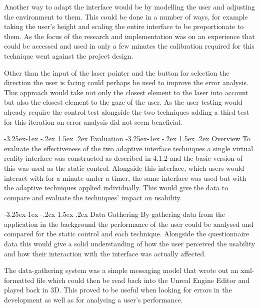 \documentclass[12pt]{article}
\makeatletter
\renewcommand{\subsection}{\@startsection{subsection}{2}{\z@}%
             {-3.25ex\@plus -1ex \@minus -.2ex}%
             {1.5ex \@plus .2ex}%
             {\normalfont\large\scshape\bfseries}}
\renewcommand{\subsubsection}{\@startsection{subsubsection}{2}{\z@}%
             {-3.25ex\@plus -1ex \@minus -.2ex}%
             {1.5ex \@plus .2ex}%
             {\normalfont\normalsize\scshape\bfseries}}
\makeatother
\begin{document}
Another way to adapt the interface would be by modelling the user and adjusting the environment to them. This could be done in a number of ways, for example taking the user's height and scaling the entire interface to be proportionate to them. As the focus of the research and implementation was on an experience that could be accessed and used in only a few minutes the calibration required for this technique went against the project design.

Other than the input of the laser pointer and the button for selection the direction the user is facing could perhaps be used to improve the error analysis. This approach would take not only the closest element to the laser into account but also the closest element to the gaze of the user. As the user testing would already require the control test alongside the two techniques adding a third test for this iteration on error analysis did not seem beneficial.

\subsection{Evaluation}
\subsubsection{Overview}
To evaluate the effectiveness of the two adaptive interface techniques a single virtual reality interface was constructed as described in 4.1.2 and the basic version of this was used as the static control. Alongside this interface, which users would interact with for a minute under a timer, the same interface was used but with the adaptive techniques applied individually. This would give the data to compare and evaluate the techniques' impact on usability.

\subsubsection{Data Gathering}
By gathering data from the application in the background the performance of the user could be analysed and compared for the static control and each technique. Alongside the questionnaire data this would give a solid understanding of how the user perceived the usability and how their interaction with the interface was actually affected.

The data-gathering system was a simple messaging model that wrote out an xml-formatted file which could then be read back into the Unreal Engine Editor and played back in 3D. This proved to be useful when looking for errors in the development as well as for analysing a user's performance.
\end{document}
